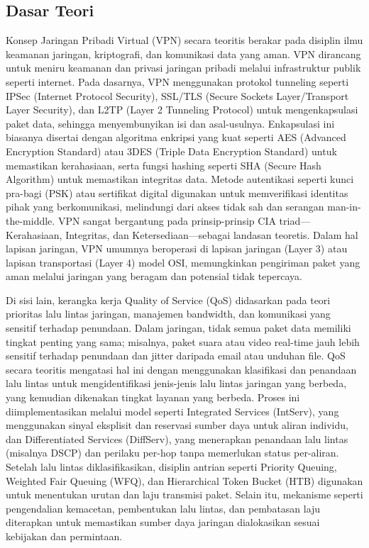\subsection{Dasar Teori}
Konsep Jaringan Pribadi Virtual (VPN) secara teoritis berakar pada disiplin ilmu keamanan jaringan, kriptografi, dan komunikasi data yang aman. VPN dirancang untuk meniru keamanan dan privasi jaringan pribadi melalui infrastruktur publik seperti internet. Pada dasarnya, VPN menggunakan protokol tunneling seperti IPSec (Internet Protocol Security), SSL/TLS (Secure Sockets Layer/Transport Layer Security), dan L2TP (Layer 2 Tunneling Protocol) untuk mengenkapsulasi paket data, sehingga menyembunyikan isi dan asal-usulnya. Enkapsulasi ini biasanya disertai dengan algoritma enkripsi yang kuat seperti AES (Advanced Encryption Standard) atau 3DES (Triple Data Encryption Standard) untuk memastikan kerahasiaan, serta fungsi hashing seperti SHA (Secure Hash Algorithm) untuk memastikan integritas data. Metode autentikasi seperti kunci pra-bagi (PSK) atau sertifikat digital digunakan untuk memverifikasi identitas pihak yang berkomunikasi, melindungi dari akses tidak sah dan serangan man-in-the-middle. VPN sangat bergantung pada prinsip-prinsip CIA triad—Kerahasiaan, Integritas, dan Ketersediaan—sebagai landasan teoretis. Dalam hal lapisan jaringan, VPN umumnya beroperasi di lapisan jaringan (Layer 3) atau lapisan transportasi (Layer 4) model OSI, memungkinkan pengiriman paket yang aman melalui jaringan yang beragam dan potensial tidak tepercaya.

Di sisi lain, kerangka kerja Quality of Service (QoS) didasarkan pada teori prioritas lalu lintas jaringan, manajemen bandwidth, dan komunikasi yang sensitif terhadap penundaan. Dalam jaringan, tidak semua paket data memiliki tingkat penting yang sama; misalnya, paket suara atau video real-time jauh lebih sensitif terhadap penundaan dan jitter daripada email atau unduhan file. QoS secara teoritis mengatasi hal ini dengan menggunakan klasifikasi dan penandaan lalu lintas untuk mengidentifikasi jenis-jenis lalu lintas jaringan yang berbeda, yang kemudian dikenakan tingkat layanan yang berbeda. Proses ini diimplementasikan melalui model seperti Integrated Services (IntServ), yang menggunakan sinyal eksplisit dan reservasi sumber daya untuk aliran individu, dan Differentiated Services (DiffServ), yang menerapkan penandaan lalu lintas (misalnya DSCP) dan perilaku per-hop tanpa memerlukan status per-aliran. Setelah lalu lintas diklasifikasikan, disiplin antrian seperti Priority Queuing, Weighted Fair Queuing (WFQ), dan Hierarchical Token Bucket (HTB) digunakan untuk menentukan urutan dan laju transmisi paket. Selain itu, mekanisme seperti pengendalian kemacetan, pembentukan lalu lintas, dan pembatasan laju diterapkan untuk memastikan sumber daya jaringan dialokasikan sesuai kebijakan dan permintaan.

